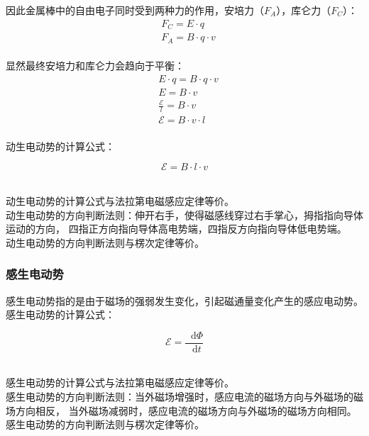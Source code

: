 \documentclass[UTF8]{ctexart}
\newcommand*{\dif}{\mathop{}\!\mathrm{d}}
\begin{document}
    因此金属棒中的自由电子同时受到两种力的作用，安培力（$F_A$），库仑力（$F_C$）：\vspace{5pt}
    \setcounter{equation}{0}
    \begin{align}
        &F_C=E\cdot q\\[3mm]
        &F_A=B\cdot q\cdot v
    \end{align}\\
    显然最终安培力和库仑力会趋向于平衡：\vspace{3pt}
    \begin{align}
        &E\cdot q=B\cdot q\cdot v\\[4mm]
        &E=B\cdot v\\[4mm]
        &\frac{\mathscr{E}}{l}=B\cdot v\\[4mm]
        &\mathscr{E}=B\cdot v\cdot l
    \end{align}\\
    动生电动势的计算公式：
    \begin{large}
        \begin{equation*}
            \mathscr{E}=B\cdot l\cdot v
        \end{equation*}
    \end{large}\\
    动生电动势的计算公式与法拉第电磁感应定律等价。\\[6mm]
    动生电动势的方向判断法则：伸开右手，使得磁感线穿过右手掌心，拇指指向导体运动的方向，
    四指正方向指向导体高电势端，四指反方向指向导体低电势端。\\[2mm]
    动生电动势的方向判断法则与楞次定律等价。\\

\subsubsection{感生电动势}
    感生电动势指的是由于磁场的强弱发生变化，引起磁通量变化产生的感应电动势。\\[3mm]
    感生电动势的计算公式：
    \begin{large}
        \begin{equation*}
            \mathscr{E}=\frac{\dif\Phi}{\dif t}
        \end{equation*}
    \end{large}\\
    感生电动势的计算公式与法拉第电磁感应定律等价。\\[6mm]
    感生电动势的方向判断法则：当外磁场增强时，感应电流的磁场方向与外磁场的磁场方向相反，
    当外磁场减弱时，感应电流的磁场方向与外磁场的磁场方向相同。\\[2mm]
    感生电动势的方向判断法则与楞次定律等价。
\end{document}
